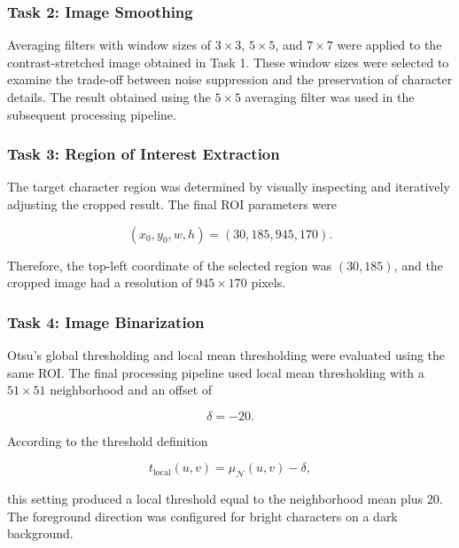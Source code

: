 \documentclass[conference]{IEEEtran}
\begin{document}
\subsubsection{Task 2: Image Smoothing}

Averaging filters with window sizes of $3\times3$, $5\times5$, and
$7\times7$ were applied to the contrast-stretched image obtained in
Task 1. These window sizes were selected to examine the trade-off
between noise suppression and the preservation of character details.
The result obtained using the $5\times5$ averaging filter was used in
the subsequent processing pipeline.

\subsubsection{Task 3: Region of Interest Extraction}

The target character region was determined by visually inspecting and
iteratively adjusting the cropped result. The final ROI parameters
were

\begin{equation}
(x_0,y_0,w,h)=(30,185,945,170).
\label{eq:experimental_roi}
\end{equation}

Therefore, the top-left coordinate of the selected region was
$(30,185)$, and the cropped image had a resolution of
$945\times170$ pixels.

\subsubsection{Task 4: Image Binarization}

Otsu's global thresholding and local mean thresholding were evaluated
using the same ROI. The final processing pipeline used local mean
thresholding with a $51\times51$ neighborhood and an offset of

\begin{equation}
\delta=-20.
\label{eq:experimental_local_offset}
\end{equation}

According to the threshold definition

\begin{equation}
t_{\mathrm{local}}(u,v)
=
\mu_{\mathcal{N}}(u,v)-\delta,
\end{equation}

this setting produced a local threshold equal to the neighborhood mean
plus 20. The foreground direction was configured for bright characters
on a dark background.
\end{document}

